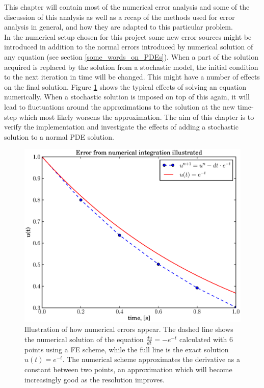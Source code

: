 
This chapter will contain most of the numerical error analysis and some of the discussion of this analysis as well as a recap of the methods used for error analysis in general, and how they are adapted to this particular problem.\\


In the numerical setup chosen for this project some new error sources might be introduced in addition to the normal errors introduced by numerical solution of any equation (see section \ref{some_words_on_PDEs}). 
When a part of the solution acquired is replaced by the solution from a stochastic model, the initial condition to the next iteration in time will be changed. 
This might have a number of effects on the final solution. 
Figure \ref{illustrate_approximate_derivatives} shows the typical effects of solving an equation numerically. When a stochastic solution is imposed on top of this again, it will lead to fluctuations around the approximations to the solution at the new time-step which most likely worsens the approximation.
The aim of this chapter is to verify the implementation and investigate the effects of adding a stochastic solution to a normal PDE solution.

\begin{figure}[H]
 \centering
 \includegraphics[scale=0.6]{Figures/numerical_error_illustrated.eps}
 \caption[Numerical errors illustration]{Illustration of how numerical errors appear. The dashed line shows the numerical solution of the equation $\frac{du}{dt} = -e^{-t}$ calculated with $6$ points using a FE scheme, while the full line is the exact solution $u(t)= e^{-t}$. The numerical scheme approximates the derivative as a constant between two points, an approximation which will become increasingly good as the resolution improves. }
 \label{illustrate_approximate_derivatives}
\end{figure}

